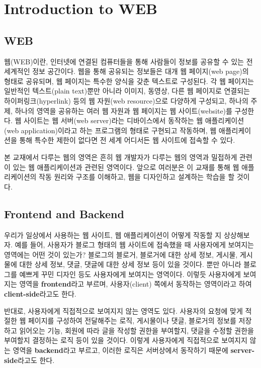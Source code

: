 \section{Introduction to WEB}\label{sect:web-intro}

\subsection*{WEB}

웹(WEB)이란, 인터넷에 연결된 컴퓨터들을 통해 사람들이 정보를 공유할 수 있는 전 세계적인 정보 공간이다. 웹을 통해 공유되는 정보들은 대개 웹 페이지(web page)의 형태로 공유되며, 웹 페이지는 특수한 양식을 갖춘 텍스트로 구성된다. 각 웹 페이지는 일반적인 텍스트(plain text)뿐만 아니라 이미지, 동영상, 다른 웹 페이지로 연결되는 하이퍼링크(hyperlink) 등의 웹 자원(web resource)으로 다양하게 구성되고, 하나의 주제, 하나의 영역을 공유하는 여러 웹 자원과 웹 페이지는 웹 사이트(website)를 구성한다. 웹 사이트는 웹 서버(web server)라는 디바이스에서 동작하는 웹 애플리케이션(web application)이라고 하는 프로그램의 형태로 구현되고 작동하며, 웹 애플리케이션을 통해 특수한 제한이 없다면 전 세계 어디서든 웹 사이트에 접속할 수 있다.

본 교재에서 다루는 웹의 영역은 흔히 웹 개발자가 다루는 웹의 영역과 밀접하게 관련이 있는 웹 애플리케이션과 관련된 영역이다. 앞으로 여러분은 이 교재를 통해 웹 애플리케이션의 작동 원리와 구조를 이해하고, 웹을 디자인하고 설계하는 학습을 할 것이다.

\subsection*{Frontend and Backend}

우리가 일상에서 사용하는 웹 사이트, 웹 애플리케이션이 어떻게 작동할 지 상상해보자. 예를 들어, 사용자가 블로그 형태의 웹 사이트에 접속했을 때 사용자에게 보여지는 영역에는 어떤 것이 있는가? 블로그의 블로거, 블로거에 대한 상세 정보, 게시물, 게시물에 대한 상세 정보, 댓글, 댓글에 대한 상세 정보 등이 있을 것이다. 뿐만 아니라 블로그를 예쁘게 꾸민 디자인 등도 사용자에게 보여지는 영역이다. 이렇듯 사용자에게 보여지는 영역을 \textbf{frontend}라고 부르며, 사용자(client) 쪽에서 동작하는 영역이라고 하여 \textbf{client-side}라고도 한다.

반대로, 사용자에게 직접적으로 보여지지 않는 영역도 있다. 사용자의 요청에 맞게 적절한 웹 페이지를 구성하여 전달해주는 로직, 게시물이나 댓글, 블로거의 정보를 저장하고 읽어오는 기능, 회원에 따라 글을 작성할 권한을 부여할지, 댓글을 수정할 권한을 부여할지 결정하는 로직 등이 있을 것이다. 이렇게 사용자에게 직접적으로 보여지지 않는 영역을 \textbf{backend}라고 부르고, 이러한 로직은 서버상에서 동작하기 때문에 \textbf{server-side}라고도 한다.

